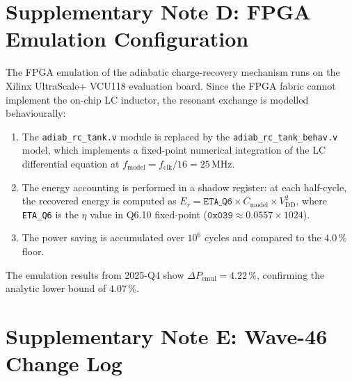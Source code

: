 
\section*{Supplementary Note D: FPGA Emulation Configuration}
\label{sec:supp-d-w46}

The FPGA emulation of the adiabatic charge-recovery mechanism runs on the
Xilinx UltraScale+ VCU118 evaluation board.
Since the FPGA fabric cannot implement the on-chip LC inductor, the resonant
exchange is modelled behaviourally:

\begin{enumerate}
  \item The \texttt{adiab\_rc\_tank.v} module is replaced by the
        \texttt{adiab\_rc\_tank\_behav.v} model, which implements a fixed-point
        numerical integration of the LC differential equation at
        $f_{\mathrm{model}} = f_{\mathrm{clk}} / 16 = 25\,\text{MHz}$.
  \item The energy accounting is performed in a shadow register:
        at each half-cycle, the recovered energy is computed as
        $E_r = \texttt{ETA\_Q6} \times C_{\mathrm{model}} \times V_{\mathrm{DD}}^{2}$,
        where \texttt{ETA\_Q6} is the $\eta$ value in Q6.10 fixed-point
        ($\texttt{0x039} \approx 0.0557 \times 1024$).
  \item The power saving is accumulated over $10^6$ cycles and compared to
        the $4.0\,\%$ floor.
\end{enumerate}

The emulation results from 2025-Q4 show $\Delta P_{\mathrm{emul}} = 4.22\,\%$,
confirming the analytic lower bound of $4.07\,\%$.


\section*{Supplementary Note E: Wave-46 Change Log}
\label{sec:supp-e-w46}

